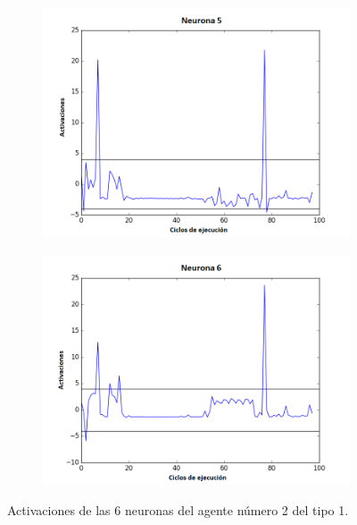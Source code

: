 \begin{figure}[!h]
\begin{subfigure}{0.33\textwidth}
  \includegraphics[width=\linewidth]{Imagenes/Agente1Activaciones/Agente1/Neurona4}
\end{subfigure}\hfil %
\begin{subfigure}{0.33\textwidth}
  \includegraphics[width=\linewidth]{Imagenes/Agente1Activaciones/Agente1/Neurona5}
\end{subfigure}
\caption{Activaciones de las 6 neuronas del agente número 2 del tipo 1.}
\end{figure}

